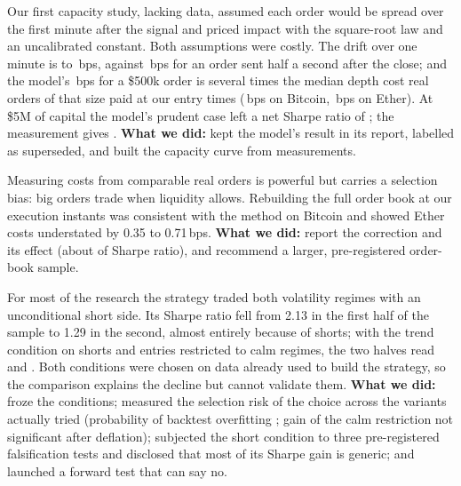\documentclass[11pt,a4paper]{article}
\newcommand{\bps}{\,bps}
\newcommand{\minus}{\textminus}
\begin{document}
\begin{keybox}
Our first capacity study, lacking data, assumed each order would be spread over the first minute after the signal and priced impact
with the square-root law and an uncalibrated constant. Both assumptions were costly. The drift over one minute is \MinuteDriftBtc{}
to \MinuteDriftEth\bps, against \DriftHalf\bps{} for an order sent half a second after the close; and the model's \ModelImpact\bps{}
for a \$500k order is several times the median depth cost real orders of that size paid at our entry times (\ImmBtc\bps{} on
Bitcoin, \ImmEth\bps{} on Ether). At \$5M of capital the model's prudent case left a net Sharpe ratio of \ModelShPrudentFive;
the measurement gives \ShDeliveredFive. \textbf{What we did:} kept the model's result in its report, labelled as superseded, and
built the capacity curve from measurements.
\end{keybox}

\begin{keybox}
Measuring costs from comparable real orders is powerful but carries a selection bias: big orders trade when liquidity allows.
Rebuilding the full order book at our execution instants was consistent with the method on Bitcoin and showed Ether costs
understated by 0.35 to 0.71\bps. \textbf{What we did:} report the correction and its effect (about \minus0.01 of Sharpe ratio),
and recommend a larger, pre-registered order-book sample.
\end{keybox}

\begin{keybox}
For most of the research the strategy traded both volatility regimes with an unconditional short side. Its Sharpe ratio fell from
2.13 in the first half of the sample to 1.29 in the second, almost entirely because of shorts; with the trend condition on shorts
and entries restricted to calm regimes, the two halves read \HalfOne{} and \HalfTwo. Both conditions were chosen on data already
used to build the strategy, so the comparison explains the decline but cannot validate them. \textbf{What we did:} froze the
conditions; measured the selection risk of the choice across the \PboN{} variants actually tried (probability of backtest
overfitting \Pbo; gain of the calm restriction not significant after deflation); subjected the short condition to three
pre-registered falsification tests and disclosed that most of its Sharpe gain is generic; and launched a forward test that can say
no.
\end{keybox}
\end{document}
